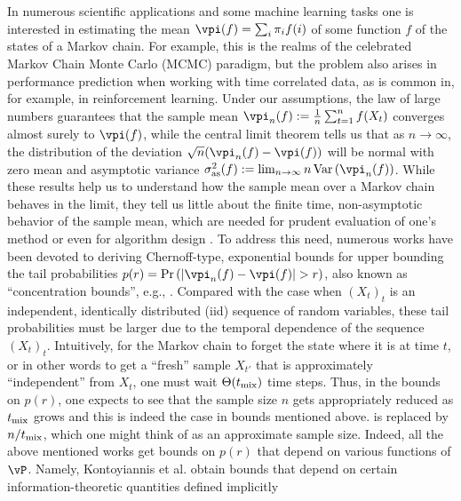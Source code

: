 In numerous scientific applications and some machine learning tasks
one is interested in estimating the mean $\vpi(f) = \sum_i \pi_i f(i)$ of some function $f$ of the states of a Markov chain. 
For example, this is the realms of the celebrated Markov Chain Monte Carlo (MCMC) paradigm, but 
the problem also arises in performance prediction when working with time correlated data, as is common in,
for example, in reinforcement learning.
Under our assumptions,
the law of large numbers guarantees that the sample mean $\vpi_n(f) \defeq \frac1n \sum_{t=1}^n f(X_t)$ 
converges almost surely to $\vpi(f)$, while the central limit theorem tells us that as $n\to \infty$, 
the distribution of the deviation $\sqrt{n}( \vpi_n(f)-\vpi(f))$ will be normal with zero mean and asymptotic
variance $\sigma^2_{\mathrm{as}}(f) \defeq \lim_{n\to\infty} n \Var\Parens{ \vpi_n(f) }$. 
While these results help us to understand how the sample mean over a Markov chain behaves in the limit,
they tell us little about the finite time, non-asymptotic behavior of the sample mean,
which are needed for prudent evaluation of one's method or even for algorithm design 
\cite{
MCMCDiscussion93%
,DBLP:conf/valuetools/KontoyiannisLM06%
,BBL06%
,MniSzeAu08%
,MauPo09%
,LiLiWaSt11:KWIK%
,flegal2011implementing%
,Gyori-paulin15%
,SwaJoa15:LoggedBandit%
}. %
To address this need, numerous works have been devoted to deriving
Chernoff-type, exponential bounds for upper bounding the tail probabilities $p(r) = \Pr\Parens{ |\vpi_n(f)-\vpi(f)|> r }$,
also known as ``concentration bounds'', e.g., 
\cite{gillman1998chernoff,leon2004optimal,DBLP:conf/valuetools/KontoyiannisLM06,paulin15}.
Compared with the case when $(X_t)_t$ is an independent, identically distributed (iid) sequence of
random variables, these tail probabilities must be larger due to the temporal dependence of the sequence $(X_t)_t$.
Intuitively, for the Markov chain to forget the state where it is at time $t$, or in other words to get a 
``fresh'' sample $X_{t'}$ that is approximately ``independent'' from $X_t$, one must wait $\Theta(t_{\operatorname{mix}})$ time steps.
Thus, in the bounds on $p(r)$, one expects to see that the sample size $n$ 
gets appropriately reduced as $t_{\operatorname{mix}}$ grows and this is indeed the case in bounds mentioned above.
is replaced by $n/t_{\operatorname{mix}}$, which one
might think of as an approximate sample size. 
Indeed, all the above mentioned works get bounds on $p(r)$ that depend on various functions of $\vP$.
Namely, Kontoyiannis et al. obtain bounds that depend on certain information-theoretic quantities defined implicitly
